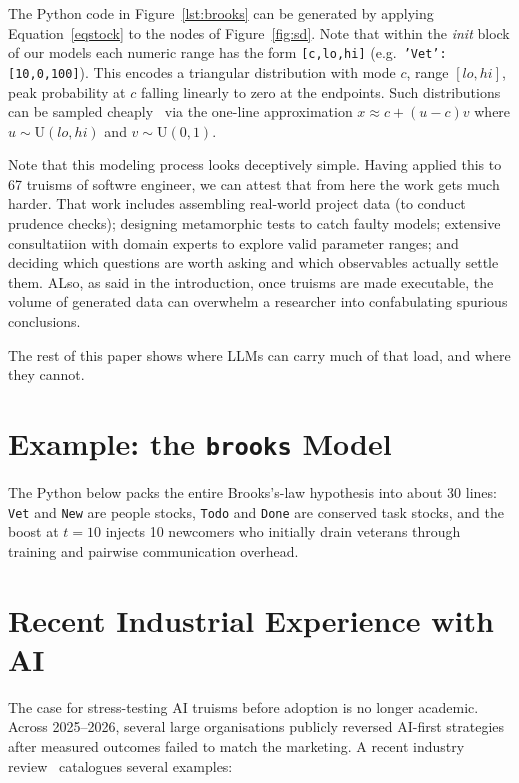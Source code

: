 \documentclass[10pt,conference]{IEEEtran}
\begin{document}
The Python code in Figure~\ref{lst:brooks}
can be generated by applying
Equation~\ref{eqstock} to the nodes of Figure~\ref{fig:sd}.
Note that within the {\em init} block of our models
each numeric range has the form \texttt{[c,lo,hi]} (e.g.\ \texttt{'Vet':[10,0,100]}).
This 
  encodes a triangular distribution with  mode $c$, range $[lo,hi]$,
  peak probability at $c$ falling linearly to zero at the endpoints.
  Such distributions can be  sampled cheaply~\cite{SCHERER2003331} via the one-line approximation
  $x \approx c + (u-c)v$ where $u \sim \mathrm{U}(lo,hi)$ and
  $v \sim \mathrm{U}(0,1)$.

Note that this modeling process looks deceptively simple. Having
applied this to 67 truisms of softwre engineer, we can attest
that from here the work
gets much harder. That work includes assembling real-world project data
(to conduct prudence checks);
designing metamorphic tests
to catch faulty models; extensive consultatiion with domain experts to explore
valid parameter
ranges;  and deciding which questions are worth asking and which
observables actually settle them.  ALso, 
as said in the introduction, once truisms are made
executable, the volume of generated data can overwhelm a
researcher into confabulating spurious conclusions.

The rest of this paper shows
where LLMs can carry much of that load, and where they cannot.

\section{Example: the \texttt{brooks} Model}
\label{sec:brooks}

The Python below packs the entire Brooks's-law hypothesis into
about 30 lines: \texttt{Vet} and \texttt{New} are people stocks,
\texttt{Todo} and \texttt{Done} are conserved task stocks, and the
boost at $t=10$ injects 10 newcomers who initially drain veterans
through training and pairwise communication overhead.

\section{Recent Industrial Experience with AI}
\label{sec:industry}

The case for stress-testing AI truisms before adoption is no
longer academic. Across 2025--2026, several large organisations
publicly reversed AI-first strategies after measured outcomes
failed to match the marketing. A recent industry
review~\cite{siliconmoney2026aicancel} catalogues several
examples:
\end{document}
